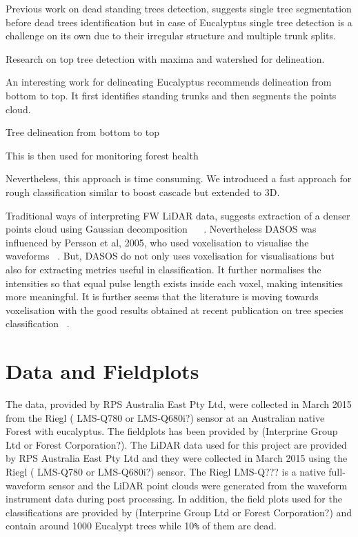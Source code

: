 \documentclass{subfiles}
\begin{document}
\par Previous work on dead standing trees detection, suggests single tree segmentation before dead trees identification \cite{Yao2012} but in case of Eucalyptus single tree detection is a challenge on its own due to their irregular structure and multiple trunk splits. 

Research on top tree detection with maxima and watershed for delineation. 

An interesting work for delineating Eucalyptus recommends delineation from bottom to top. It first identifies standing trunks and then segments the points cloud. 

Tree delineation from bottom to top \cite{Shendryk2016_treeDeliniation}


This is then used for monitoring forest health \cite{Shendryk2016_DeadTrees}

Nevertheless, this approach is time consuming. We introduced a fast approach for rough classification similar to boost cascade \cite{Viola2001} but extended to 3D. 




\par Traditional ways of interpreting FW LiDAR data, suggests extraction of a denser points cloud using Gaussian decomposition ~\cite{Neuenschwander2009} ~\cite{Reitberger2008}. Nevertheless DASOS was influenced by Persson et al, 2005, who used voxelisation to visualise the waveforms ~\cite{Persson2005}. But, DASOS do not only uses voxelisation for visualisations but also for extracting metrics useful in classification. It further normalises the intensities so that equal pulse length exists inside each voxel, making intensities more meaningful. It is further seems that the literature is moving towards voxelisation with the good results obtained at recent publication on tree species classification ~\cite{Cao2016}. 

\section{Data and Fieldplots}

\par The data, provided by RPS Australia East Pty Ltd, were collected in March 2015 from the Riegl ( LMS-Q780 or LMS-Q680i?) sensor at an Australian native Forest with eucalyptus. The fieldplots has been provided by (Interprine Group Ltd or Forest Corporation?). 
The LiDAR data used for this project are provided by RPS Australia East Pty Ltd and they were collected in March 2015 using the Riegl ( LMS-Q780 or LMS-Q680i?) sensor. The Riegl LMS-Q??? is a native full-waveform sensor and the LiDAR point clouds were generated from the waveform instrument data during post processing. In addition, the field plots used for the classifications are provided by (Interprine Group Ltd or Forest Corporation?) and contain around 1000 Eucalypt trees while 10\verb|%| of them are dead. 
\end{document}
